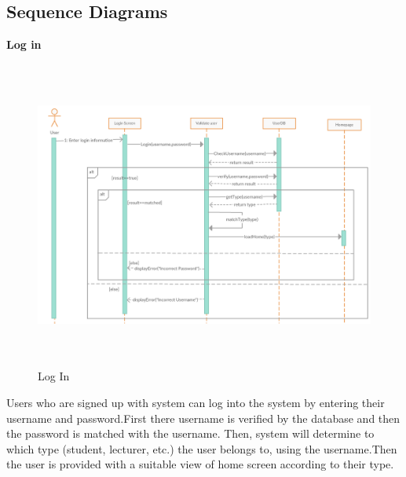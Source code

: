 \documentclass[a4paper,beamer]{article}
\begin{document}
	\subsection{Sequence Diagrams}
		\textbf{Log in}\newline
			
		\begin{figure}[h!]
			\begin{center}
			\includegraphics[width=6in,height=4in]{img/seq-login}
			\end{center}
			\caption{Log In}
			\label{fig:Log In}
		\end{figure}
		\vspace{1.5cm}
		
		 Users who are signed up with system can log into the system by entering their username and password.First there username is verified by the database and then the password is matched with the username.\newline
		Then, system will determine to which type (student, lecturer, etc.) the user belongs to, using the username.Then  the user is provided with a suitable view of home screen according to their type.\newline

		\newpage
		
\end{document}
